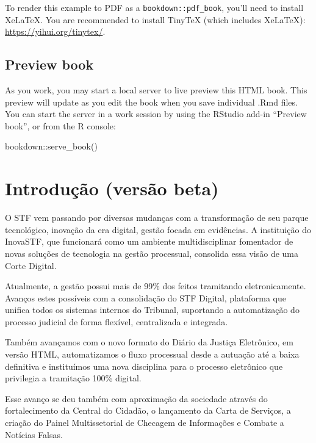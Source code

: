 \documentclass[
]{book}
\newenvironment{Shaded}{\begin{snugshade}}{\end{snugshade}}
\newcommand{\FunctionTok}[1]{\textcolor[rgb]{0.00,0.00,0.00}{#1}}
\newcommand{\NormalTok}[1]{#1}
\newcommand{\SpecialCharTok}[1]{\textcolor[rgb]{0.00,0.00,0.00}{#1}}
\theoremstyle{definition}
\theoremstyle{definition}
\theoremstyle{definition}
\theoremstyle{definition}
\theoremstyle{remark}
\begin{document}
To render this example to PDF as a \texttt{bookdown::pdf\_book}, you'll need to install XeLaTeX. You are recommended to install TinyTeX (which includes XeLaTeX): \url{https://yihui.org/tinytex/}.

\hypertarget{preview-book}{%
\section{Preview book}\label{preview-book}}

As you work, you may start a local server to live preview this HTML book. This preview will update as you edit the book when you save individual .Rmd files. You can start the server in a work session by using the RStudio add-in ``Preview book'', or from the R console:

\begin{Shaded}
\begin{Highlighting}[]
\NormalTok{bookdown}\SpecialCharTok{::}\FunctionTok{serve\_book}\NormalTok{()}
\end{Highlighting}
\end{Shaded}

\hypertarget{introduuxe7uxe3o-versuxe3o-beta}{%
\chapter{Introdução (versão beta)}\label{introduuxe7uxe3o-versuxe3o-beta}}

O STF vem passando por diversas mudanças com a transformação de seu parque tecnológico, inovação da era digital, gestão focada em evidências. A instituição do InovaSTF, que funcionará como um ambiente multidisciplinar fomentador de novas soluções de tecnologia na gestão processual, consolida essa visão de uma Corte Digital.

Atualmente, a gestão possui mais de 99\% dos feitos tramitando eletronicamente. Avanços estes possíveis com a consolidação do STF Digital, plataforma que unifica todos os sistemas internos do Tribunal, suportando a automatização do processo judicial de forma flexível, centralizada e integrada.

Também avançamos com o novo formato do Diário da Justiça Eletrônico, em versão HTML, automatizamos o fluxo processual desde a autuação até a baixa definitiva e instituímos uma nova disciplina para o processo eletrônico que privilegia a tramitação 100\% digital.

Esse avanço se deu também com aproximação da sociedade através do fortalecimento da Central do Cidadão, o lançamento da Carta de Serviços, a criação do Painel Multissetorial de Checagem de Informações e Combate a Notícias Falsas.
\end{document}
